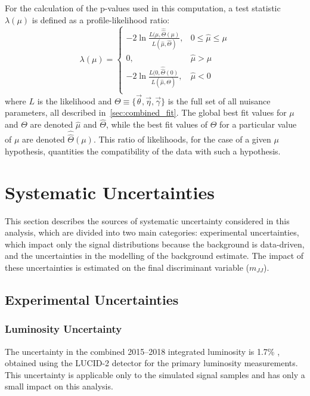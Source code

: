 For the calculation of the p-values used in this computation, a test statistic $\lambda(\mu)$ is defined as a profile-likelihood ratio:
\[ \lambda(\mu) = \begin{cases}
    -2 \ln{\frac{L(\mu, \hat{\hat{\Theta}}(\mu)}{L(\hat{\mu}, \hat{\Theta})}}, & 0 \leq \hat{\mu} \leq \mu \\
        0, & \hat{\mu} > \mu \\
    -2 \ln{\frac{L(0, \hat{\hat{\Theta}}(0)}{L(\hat{\mu}, \hat{\Theta})}}, & \hat{\mu} < 0 \\
   \end{cases}
\]
where $L$ is the likelihood and $\Theta \equiv \{\vec{\theta}, \vec{\eta}, \vec{\gamma}\}$ is the full set of all nuisance parameters, all described in~\ref{sec:combined_fit}.
The global best fit values for $\mu$ and $\Theta$ are denoted $\hat{\mu}$ and $\hat{\Theta}$, while the best fit values of $\Theta$ for a particular value of $\mu$ are denoted $\hat{\hat{\Theta}}(\mu)$.
This ratio of likelihoods, for the case of a given $\mu$ hypothesis, quantities the compatibility of the data with such a hypothesis.

\section{Systematic Uncertainties}
\label{sec:syst}

This section describes the sources of systematic uncertainty considered in this analysis, which are divided into two main categories: experimental uncertainties, which impact only the signal distributions because the background is data-driven, and the uncertainties in the modelling of the background estimate. The impact of these uncertainties is estimated on the final discriminant variable ($m_{JJ}$).

\subsection{Experimental Uncertainties}
\label{sec:syst-exp}
%
\subsubsection{Luminosity Uncertainty}
The uncertainty in the combined 2015--2018 integrated luminosity is 1.7\% \cite{ATLAS-CONF-2019-021}, obtained using the LUCID-2 detector \cite{LUCID2} for the primary luminosity measurements.
This uncertainty is applicable only to the simulated signal samples and has only a small impact on this analysis.

